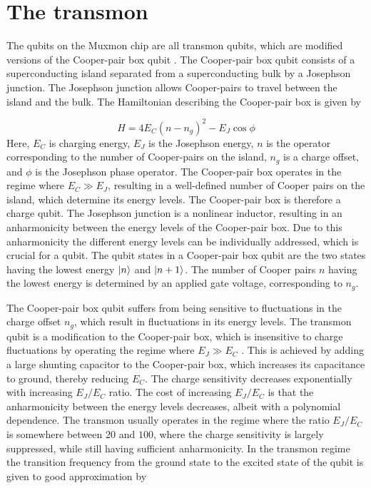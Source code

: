    \section{The transmon}
      \label{sec:The transmon}
      The qubits on the Muxmon chip are all transmon qubits, which are modified versions of the Cooper-pair box qubit \cite{bouchiat1998CooperPairBox,nakamura1999coherent}. The Cooper-pair box qubit consists of a superconducting island separated from a superconducting bulk by a Josephson junction. The Josephson junction allows Cooper-pairs to travel between the island and the bulk. The Hamiltonian describing the Cooper-pair box is given by

      \begin{equation}
        H=4 E_C (n - n_g)^2-E_J \cos \phi
        \label{eq:Cooper-pair box Hamiltonian}
      \end{equation}
      Here, $E_C$ is charging energy, $E_J$ is the Josephson energy, $n$ is the operator corresponding to the number of Cooper-pairs on the island, $n_g$ is a charge offset, and $\phi$ is the Josephson phase operator. The Cooper-pair box operates in the regime where $E_C \gg E_J$, resulting in a well-defined number of Cooper pairs on the island, which determine its energy levels. The Cooper-pair box is therefore a charge qubit. The Josephson junction is a nonlinear inductor, resulting in an anharmonicity between the energy levels of the Cooper-pair box. Due to this anharmonicity the different energy levels can be individually addressed, which is crucial for a qubit. The qubit states in a Cooper-pair box qubit are the two states having the lowest energy $\ket{n}$ and $\ket{n+1}$. The number of Cooper pairs $n$ having the lowest energy is determined by an applied gate voltage, corresponding to $n_g$.

      The Cooper-pair box qubit suffers from being sensitive to fluctuations in the charge offset $n_g$, which result in fluctuations in its energy levels. The transmon qubit is a modification to the Cooper-pair box, which is insensitive to charge fluctuations by operating the regime where $E_J \gg E_C$ \cite{koch2007Transmon,schreier2008suppressing}. This is achieved by adding a large shunting capacitor to the Cooper-pair box, which increases its capacitance to ground, thereby reducing $E_C$. The charge sensitivity decreases exponentially with increasing $E_J/E_C$ ratio. The cost of increasing $E_J/E_C$ is that the anharmonicity between the energy levels decreases, albeit with a polynomial dependence. The transmon usually operates in the regime where the ratio $E_J/E_C$ is somewhere between $20$ and $100$, where the charge sensitivity is largely suppressed, while still having sufficient anharmonicity. In the transmon regime the transition frequency from the ground state to the excited state of the qubit is given to good approximation by \cite[p.52]{Reed}

